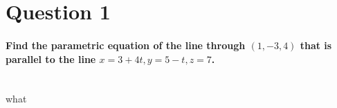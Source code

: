 \section{Question 1}%
\label{sec: Question 1 }
\paragraph{Find the parametric equation of the line through $ \left( 1,-3,4 \right)  $ that is parallel to the line $ x=3+4t, y=5-t, z=7 $. \\ \\}

what
